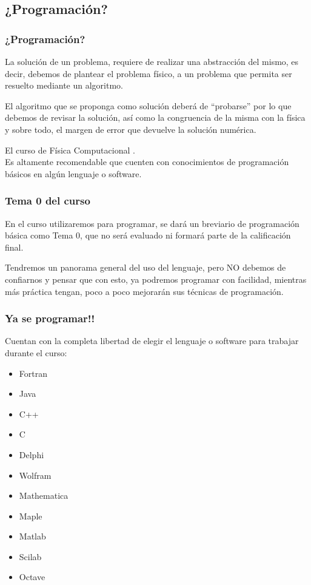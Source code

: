 \subsection{¿Programación?}
\begin{frame}
\frametitle{¿Programación?}
La solución de un problema, requiere de realizar una abstracción del mismo, es decir, debemos de plantear el problema físico, a un problema que permita ser resuelto mediante un algoritmo.
\end{frame}
\begin{frame}
El algoritmo que se proponga como solución deberá de \enquote{probarse} por lo que debemos de revisar la solución, así como la congruencia de la misma con la física y sobre todo, el margen de error que devuelve la solución numérica.
\end{frame}
\begin{frame}
El curso de Física Computacional .
\\
\bigskip
Es altamente recomendable que cuenten con conocimientos de programación básicos en algún lenguaje o software.
\end{frame}
\begin{frame}
\frametitle{Tema 0 del curso}
En el curso utilizaremos  para programar, se dará un breviario de programación básica como Tema 0, que no será evaluado ni formará parte de la calificación final.
\end{frame}
\begin{frame}
Tendremos un panorama general del uso del lenguaje, pero NO debemos de confiarnos y pensar que con esto, ya podremos programar con facilidad, mientras más práctica tengan, poco a poco mejorarán sus técnicas de programación.
\end{frame}
\begin{frame}
\frametitle{Ya se programar!!}
Cuentan con la completa libertad de elegir el lenguaje o software para trabajar durante el curso:
\begin{multicols}{2}
\begin{itemize}
\item Fortran
\item Java
\item C++
\item C
\item Delphi
\item Wolfram
\item Mathematica
\item Maple
\item Matlab
\item Scilab
\item Octave
\end{itemize}
\end{multicols}
\end{frame}
